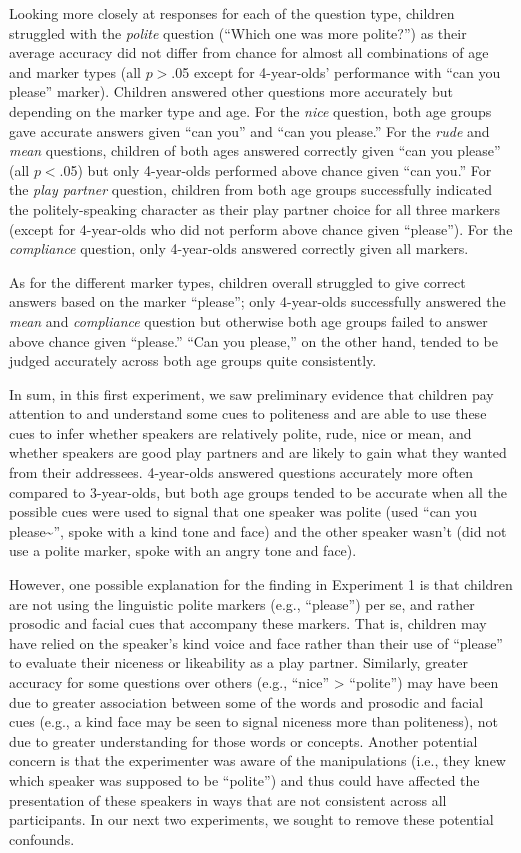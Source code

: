 \documentclass[10pt, letterpaper]{article}
\begin{document}
Looking more closely at responses for each of the question type,
children struggled with the \emph{polite} question (``Which one was more
polite?'') as their average accuracy did not differ from chance for
almost all combinations of age and marker types (all \(p>\).05 except
for 4-year-olds' performance with ``can you please'' marker). Children
answered other questions more accurately but depending on the marker
type and age. For the \emph{nice} question, both age groups gave
accurate answers given ``can you'' and ``can you please.'' For the
\emph{rude} and \emph{mean} questions, children of both ages answered
correctly given ``can you please'' (all \(p<\).05) but only 4-year-olds
performed above chance given ``can you.'' For the \emph{play partner}
question, children from both age groups successfully indicated the
politely-speaking character as their play partner choice for all three
markers (except for 4-year-olds who did not perform above chance given
``please''). For the \emph{compliance} question, only 4-year-olds
answered correctly given all markers.

As for the different marker types, children overall struggled to give
correct answers based on the marker ``please''; only 4-year-olds
successfully answered the \emph{mean} and \emph{compliance} question but
otherwise both age groups failed to answer above chance given
``please.'' ``Can you please,'' on the other hand, tended to be judged
accurately across both age groups quite consistently.

In sum, in this first experiment, we saw preliminary evidence that
children pay attention to and understand some cues to politeness and are
able to use these cues to infer whether speakers are relatively polite,
rude, nice or mean, and whether speakers are good play partners and are
likely to gain what they wanted from their addressees. 4-year-olds
answered questions accurately more often compared to 3-year-olds, but
both age groups tended to be accurate when all the possible cues were
used to signal that one speaker was polite (used ``can you
please\textasciitilde{}'', spoke with a kind tone and face) and the
other speaker wasn't (did not use a polite marker, spoke with an angry
tone and face).

However, one possible explanation for the finding in Experiment 1 is
that children are not using the linguistic polite markers (e.g.,
``please'') per se, and rather prosodic and facial cues that accompany
these markers. That is, children may have relied on the speaker's kind
voice and face rather than their use of ``please'' to evaluate their
niceness or likeability as a play partner. Similarly, greater accuracy
for some questions over others (e.g., ``nice'' \textgreater{}
``polite'') may have been due to greater association between some of the
words and prosodic and facial cues (e.g., a kind face may be seen to
signal niceness more than politeness), not due to greater understanding
for those words or concepts. Another potential concern is that the
experimenter was aware of the manipulations (i.e., they knew which
speaker was supposed to be ``polite'') and thus could have affected the
presentation of these speakers in ways that are not consistent across
all participants. In our next two experiments, we sought to remove these
potential confounds.
\end{document}
